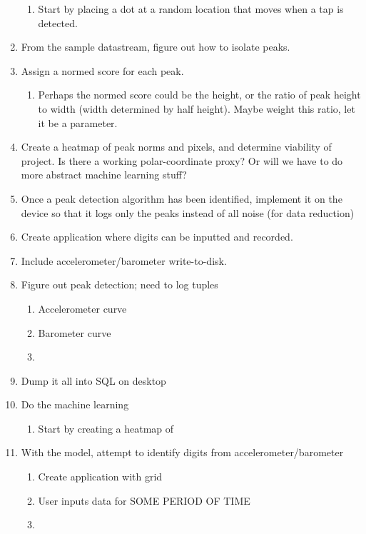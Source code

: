 \documentclass[12pt]{article}
\begin{document}
\begin{enumerate}
	\begin{enumerate}
		\item Start by placing a dot at a random location that moves when a tap is detected.
	\end{enumerate}
	\item From the sample datastream, figure out how to isolate peaks. 
	\item Assign a normed score for each peak.
	\begin{enumerate}
		\item Perhaps the normed score could be the height, or the ratio of peak height to width (width determined by half height). Maybe weight this ratio, let it be a parameter.
	\end{enumerate}
	\item Create a heatmap of peak norms and pixels, and determine viability of project. Is there a working polar-coordinate proxy? Or will we have to do more abstract machine learning stuff?
	\item Once a peak detection algorithm has been identified, implement it on the device so that it logs only the peaks instead of all noise (for data reduction)
	\item Create application where digits can be inputted and recorded.
	\item Include accelerometer/barometer write-to-disk.
	\item Figure out peak detection; need to log tuples
	\begin{enumerate}
		\item Accelerometer curve
		\item Barometer curve
		\item 
	\end{enumerate}
	\item Dump it all into SQL on desktop
	\item Do the machine learning
	\begin{enumerate}
		\item Start by creating a heatmap of 
	\end{enumerate}
	\item With the model, attempt to identify digits from accelerometer/barometer
	\begin{enumerate}
		\item Create application with grid
		\item User inputs data for SOME PERIOD OF TIME
		\item 
	\end{enumerate}
\end{enumerate}
\end{document}
